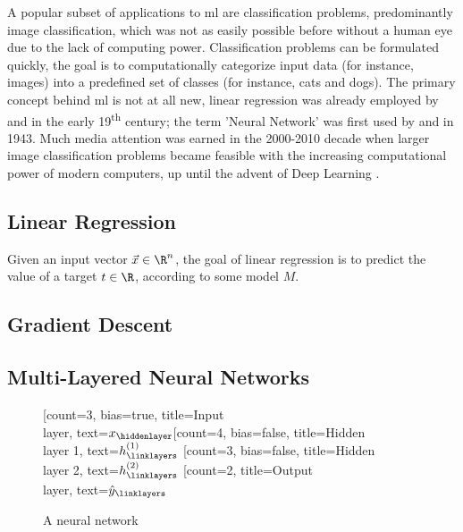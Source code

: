 A popular subset of applications to \gls{ml} are classification problems, predominantly image classification, which was not as easily possible before without a human eye due to the lack of computing power.
Classification problems can be formulated quickly, the goal is to computationally categorize input data (for instance, images) into a predefined set of classes (for instance, cats and dogs).
The primary concept behind \acrlong{ml} is not at all new, linear regression was already employed by  and  in the early 19\textsuperscript{th} century; the term 'Neural Network' was first used by  and  in 1943.
Much media attention was earned in the 2000-2010 decade when larger image classification problems became feasible with the increasing computational power of modern computers, up until the advent of Deep Learning \parencite{bishop-pattern-recognition-and-ml}.

\subsection{Linear Regression}
Given an input vector $\vec{x} \in \R^n$, the goal of linear regression is to predict the value of a target $t \in \R$, according to some model $M$.

\subsection{Gradient Descent}
\subsection{Multi-Layered Neural Networks}
\begin{figure}[H]
  \centering
  \begin{neuralnetwork}[height=4]
    \newcommand{\x}[2]{$x_#2$}
    \newcommand{\y}[2]{$\hat{y}_#2$}
    \newcommand{\hfirst}[2]{\small $h^{(1)}_#2$}
    \newcommand{\hsecond}[2]{\small $h^{(2)}_#2$}
    [count=3, bias=true, title=Input\\layer, text=\x]
    \hiddenlayer[count=4, bias=false, title=Hidden\\layer 1, text=\hfirst] \linklayers
    \hiddenlayer[count=3, bias=false, title=Hidden\\layer 2, text=\hsecond] \linklayers
    \outputlayer[count=2, title=Output\\layer, text=\y] \linklayers
  \end{neuralnetwork}
  \caption{A neural network}
\end{figure}

